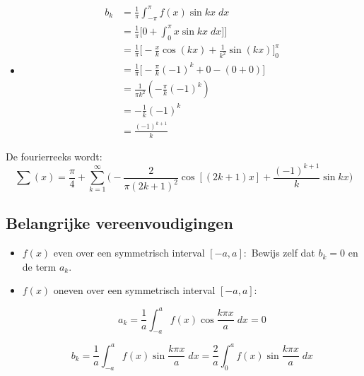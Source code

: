 {\begin{itemize}[label={}]
			\item   \begin{equation*}
				      \begin{split}
					      b_k & = \frac{1}{\pi} \int_{-\pi}^{\pi} f(x)\sin kx \;dx \\
					      & = \frac{1}{\pi} \bigg[0 + \int_0^{\pi}x\sin kx\;dx]\bigg] \\
					      & = \frac{1}{\pi} \bigg[-\frac{x}{k}\cos(kx) + \frac{1}{k^2}\sin(kx)\bigg]_{0}^{\pi} \\
					      & = \frac{1}{\pi} \bigg[-\frac{\pi}{k}(-1)^k + 0 - ( 0 + 0)\bigg] \\
					      & = \frac{1}{\pi k^2}(-\frac{\pi}{k}(-1)^k) \\
					      & = -\frac{1}{k}(-1)^k \\
					      & = \frac{(-1)^{k + 1}}{k}
				      \end{split}
			      \end{equation*}
		\end{itemize}
		De fourierreeks wordt:
		$$\sum (x) = \frac{\pi}{4} + \sum_{k = 1}^{\infty} \bigg(-\frac{2}{\pi(2k + 1)^2}\cos[(2k + 1)x]  + \frac{(-1)^{k + 1}}{k}\sin kx\bigg)$$
	}

	\subsection{Belangrijke vereenvoudigingen}
	\begin{itemize}
		\item $f(x)$ even over een symmetrisch interval $[-a, a]:$
		      Bewijs zelf dat $b_k =0$ en de term $a_k$.
		\item $f(x)$ oneven over een symmetrisch interval $[-a, a]:$

		      $$a_k = \frac{1}{a}\int_{-a}^{a} f(x) \cos \frac{k\pi x}{a}\;dx = 0$$

		      $$b_k = \frac{1}{a}\int_{-a}^{a} f(x) \sin \frac{k\pi x}{a}\;dx = \frac{2}{a}\int_{0}^{a} f(x) \sin \frac{k\pi x}{a}\;dx $$

	\end{itemize}


